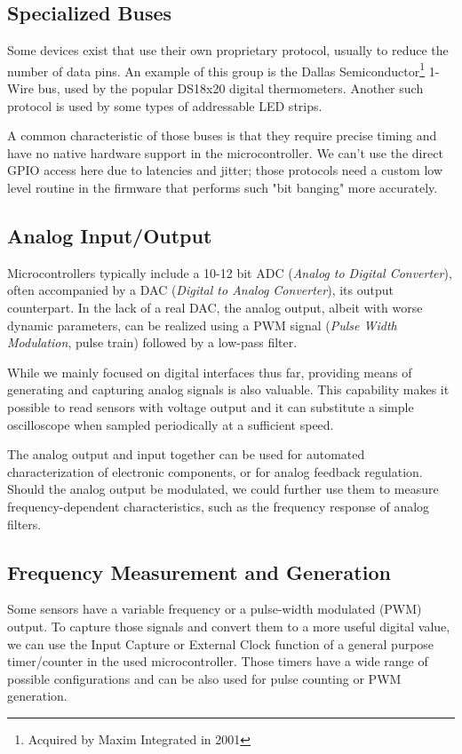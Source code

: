 \subsection{Specialized Buses}

Some devices exist that use their own proprietary protocol, usually to reduce the number of data pins. An example of this group is the Dallas Semiconductor\footnote{Acquired by Maxim Integrated in 2001} 1-Wire bus, used by the popular DS18x20 digital thermometers. Another such protocol is used by some types of addressable LED strips.

A common characteristic of those buses is that they require precise timing and have no native hardware support in the microcontroller. We can't use the direct GPIO access here due to latencies and jitter; those protocols need a custom low level routine in the firmware that performs such "bit banging" more accurately.

\subsection{Analog Input/Output}

Microcontrollers typically include a 10-12 bit ADC (\textit{Analog to Digital Converter}), often accompanied by a DAC (\textit{Digital to Analog Converter}), its output counterpart. In the lack of a real DAC, the analog output, albeit with worse dynamic parameters, can be realized using a PWM signal (\textit{Pulse Width Modulation}, pulse train) followed by a low-pass filter.

While we mainly focused on digital interfaces thus far, providing means of generating and capturing analog signals is also valuable. This capability makes it possible to read sensors with voltage output and it can substitute a simple oscilloscope when sampled periodically at a sufficient speed. 

The analog output and input together can be used for automated characterization of electronic components, or for analog feedback regulation. Should the analog output be modulated, we could further use them to measure frequency-dependent characteristics, such as the frequency response of analog filters.

\subsection{Frequency Measurement and Generation}

Some sensors have a variable frequency or a pulse-width modulated (PWM) output. To capture those signals and convert them to a more useful digital value, we can use the Input Capture or External Clock function of a general purpose timer/counter in the used microcontroller. Those timers have a wide range of possible configurations and can be also used for pulse counting or PWM generation.

